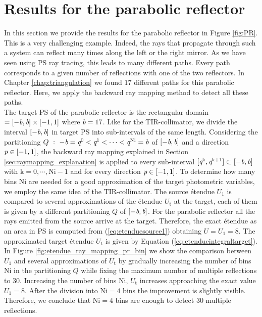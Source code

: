 \section{Results for the parabolic reflector}\label{sec:PR}
In this section we provide the results for the parabolic reflector in Figure \ref{fig:PR}.
This is a very challenging example. Indeed, the rays that propagate through such a system can reflect many times along the left or the right mirror. As we have seen using PS ray tracing, this leads to many different paths. Every path corresponds to a given number of reflections with one of the two reflectors. In Chapter \ref{chap:triangulation} we found $17$ different paths for this parabolic reflector. Here, we apply the backward ray mapping method to detect all these paths. \\ \indent
The target PS of the parabolic reflector is the rectangular domain $=[-\textit{b}, \textit{b}]\times[-1,1]$ where $\textit{b}=17$. Like for the TIR-collimator, we divide the interval $[-\textit{b}, \textit{b}]$ in target PS into sub-intervals of the same length. Considering the partitioning $Q~:~ -\textit{b}=\textit{q}^{0}<\textit{q}^{1}<\cdots<\textit{q}^{\textrm{Ni}}=\textit{b}$ of $[-\textit{b}, \textit{b}]$ and a direction $\textit{p}\in[-1,1]$, the backward ray mapping explained in Section \ref{sec:raymapping_explanation} is applied to every sub-interval $[\textit{q}^{\textrm{k}}, \textit{q}^{\textrm{k+1}}]\subset[-\textit{b}, \textit{b}]$ with $\textrm{k}=0, \cdots, \textrm{Ni}-1$ and for every direction $\textit{p}\in[-1,1]$. To determine how many bins $\textrm{Ni}$ are needed for a good approximation of the target photometric variables, we employ the same idea of the TIR-collimator. The source \'{e}tendue $U_1$ is compared to several approximations of the \'{e}tendue $U_{\textrm{t}}$ at the target, each of them is given by a different partitioning $Q$ of $[-\textit{b}, \textit{b}]$. For the parabolic reflector all the rays emitted from the source arrive at the target. Therefore, the exact \'{e}tendue as an area in PS is computed from (\ref{eq:etenduesource1}) obtaining $U=U_1=8$. The approximated target \'{e}tendue $U_{\textrm{t}}$ is given by Equation (\ref{eq:etendueintegraltarget}). In Figure \ref{fig:etendue_ray_mapping_pr_bin} we show the comparison between $U_1$ and several approximations of $U_{\textrm{t}}$ by gradually increasing the number of bins $\textrm{Ni}$ in the partitioning $Q$ while fixing the maximum number of multiple reflections to $30$. Increasing the number of bins $\textrm{Ni}$, $U_{\textrm{t}}$ increases approaching the exact value $U_1=8$. After the division into $\textrm{Ni}=4$ bins the improvement is slightly visible. Therefore, we conclude that $\textrm{Ni}=4$ bins are enough to detect $30$ multiple reflections.
